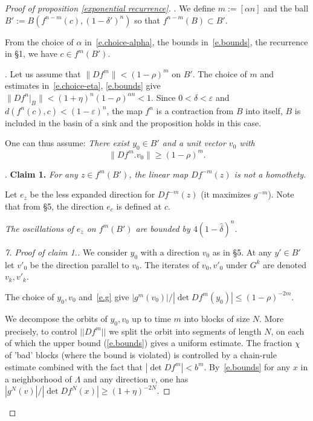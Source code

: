 \documentclass[a4paper,11pt]{article}
\theoremstyle{definition}
\def\La{\Lambda}
\def\La{\Lambda}
\begin{document}
\begin{proof}[Proof of proposition \ref{exponential recurrence}]
. We define $m:=[\alpha n]$ and the ball $B':=B(f^{n-m}(c),(1-\delta')^n)$ so that $f^{n-m}(B)\subset B'$.\hspace{-1cm}\mbox{}
\smallskip

\noindent
From the choice of $\alpha$ in~\eqref{e.choice-alpha}, the bounds in~\eqref{e.bounds}, the recurrence in \S1, we have $c\in f^{m}(B')$.
\bigskip

. Let us assume that $\|Df^m\|<(1-\rho)^m$ on $B'$. The choice of $m$ and estimates in~\eqref{e.choice-eta}, \eqref{e.bounds} give
$\|Df^n|_B\|<(1+\eta)^n(1-\rho)^{\alpha n}<1.$
Since $0<\delta<\varepsilon$ and $d(f^n(c),c)<(1-\varepsilon)^n$,
the map $f^n$ is a contraction from $B$ into itself, $B$ is included in the basin of a sink and the proposition holds in this case.
\smallskip

\noindent
One can thus assume: \emph{There exist $y_0\in B'$ and a unit vector $v_0$ with} 
\begin{equation}\label{e.g}
\|Df^m.v_0\|\geq (1-\rho)^m.
\end{equation}



. {\bf Claim 1.}
\emph{For any $z\in f^{m}(B')$, the linear map $Df^{-m}(z)$ is not a homothety.}
\medskip

\noindent
Let $e_z$ be the less expanded direction for $Df^{-m}(z)$  (it maximizes $g^{-m}$).
Note that from \S 5, the direction $e_c$ is defined at $c$.
\medskip

\noindent
{}
\emph{The oscillations of $e_z$ on $f^{m}(B')$ are bounded by $4(1-\widehat \delta)^n$.}
\bigskip

\begin{proof}[{\rm 7.} Proof of claim 1.]
We consider $y_0$ with a direction $v_0$ as in \S5. At any $y'\in B'$ let
$v'_0$ be the direction parallel to $v_0$.
The iterates of $v_0,v'_0$ under $G^k$ are denoted $v_k,v'_k$.
\medskip

\noindent
The choice of $y_0,v_0$ and~\eqref{e.g} give $|g^m(v_0)|/|\det Df^m(y_0)|\leq (1-\rho)^{-2m}.$
\smallskip

\noindent
We decompose the orbits of $y_0, v_0$ up to time $m$
into blocks of size $N$. More precisely, to control $||Df^m||$ we split the orbit into segments of length $N$, on each of which the upper bound (\ref{e.bounds}) gives a uniform estimate. The fraction $\chi$ of 'bad' blocks (where the bound is violated) is controlled by a chain-rule estimate combined with the fact that  $|\det Df^m| < b^m$. By~\eqref{e.bounds} for any $x$ in a neighborhood of $\La$ and any direction $v$,
one has $|g^N(v)|/|\det Df^N(x)|\geq (1+\eta)^{-2N}.$
\smallskip


\end{proof}
\end{proof}
\end{document}
